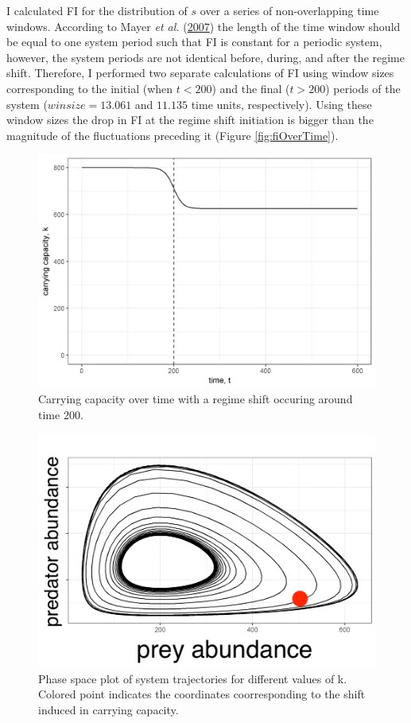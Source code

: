 \documentclass[print]{nuthesis}
\begin{document}
I calculated FI for the distribution of \(s\) over a series of non-overlapping time windows. According to Mayer \emph{et al.} (\protect\hyperlink{ref-mayer_applications_2007}{2007}) the length of the time window should be equal to one system period such that FI is constant for a periodic system, however, the system periods are not identical before, during, and after the regime shift. Therefore, I performed two separate calculations of FI using window sizes corresponding to the initial (when \(t<200\)) and the final (\(t>200\)) periods of the system (\(winsize = 13.061\) and \(11.135\) time units, respectively). Using these window sizes the drop in FI at the regime shift initiation is bigger than the magnitude of the fluctuations preceding it (Figure \ref{fig:fiOverTime}).
\begin{figure}
\includegraphics[width=0.95\linewidth]{./chapterFiles/fiGuide/figures/kByTime} \caption{Carrying capacity over time with a regime shift occuring around time 200.}\label{fig:kByTime}
\end{figure}
\begin{figure}
\includegraphics[width=0.95\linewidth]{.//chapterFiles/fiGuide/figures/kTrajectories} \caption{Phase space plot of system trajectories for different values of k. Colored point indicates the coordinates coorresponding to the shift induced in carrying capacity. }\label{fig:kTrajectories}
\end{figure}
\end{document}
